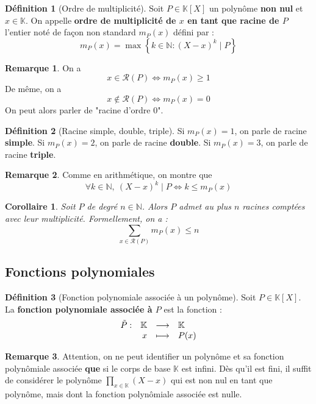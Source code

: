 \documentclass[french]{book}
\newcommand{\N}{\mathbb{N}}
\newcommand{\K}{\mathbb{K}}
\theoremstyle{plain}
\newtheorem{cor}{Corollaire}[chapter]
\theoremstyle{definition}
\newtheorem{dfn}{Définition}[chapter]
\newtheorem{rmq}{Remarque}[chapter]
\theoremstyle{remark}
\begin{document}
\begin{dfn}[Ordre de multiplicité]
	Soit $P\in\K[X]$ un polynôme \textbf{non nul} et $x\in\K$. On appelle \textbf{ordre de multiplicité de $x$ en tant que racine de $P$} l'entier noté de façon non standard $m_P(x)$ défini par : $$m_P(x)=\max\left\{k\in\N : (X-x)^k\mid P\right\}$$
\end{dfn}
\begin{rmq}
	On a $$x\in\mathcal{R}(P)\Longleftrightarrow m_P(x)\geqslant1$$ De même, on a $$x\notin\mathcal{R}(P)\Longleftrightarrow m_P(x)=0$$ On peut alors parler de "racine d'ordre 0".
\end{rmq}
\begin{dfn}[Racine simple, double, triple]
	Si $m_P(x)=1$, on parle de racine \textbf{simple}. Si $m_P(x)=2$, on parle de racine \textbf{double}. Si $m_P(x)=3$, on parle de racine \textbf{triple}.
\end{dfn}
\begin{rmq}
	Comme en arithmétique, on montre que $$\forall k\in\N,\ (X-x)^k\mid P \Longleftrightarrow k\leqslant m_P(x)$$
\end{rmq}
\begin{cor}
	Soit $P$ de degré $n\in\N$. Alors $P$ admet au plus $n$ racines comptées avec leur multiplicité. Formellement, on a : $$\sum_{x\in\mathcal{R}(P)}m_P(x)\leqslant n$$
\end{cor}
\subsection{Fonctions polynomiales}
\begin{dfn}[Fonction polynomiale associée à un polynôme]
	Soit $P\in\K[X]$. La \textbf{fonction polynomiale associée à $P$} est la fonction : 
	$$\begin{array}[t]{lrcl}
		\tilde{P}: &\K & \longrightarrow & \K \\
		& x& \longmapsto & P(x)
	\end{array}$$
\end{dfn}
\begin{rmq}
	Attention, on ne peut identifier un polynôme et sa fonction polynômiale associée \textbf{que} si le corps de base $\K$ est infini. Dès qu'il est fini, il suffit de considérer le polynôme $\displaystyle\prod_{x\in\K}(X-x)$ qui est non nul en tant que polynôme, mais dont la fonction polynômiale associée est nulle.
\end{rmq}
\end{document}
